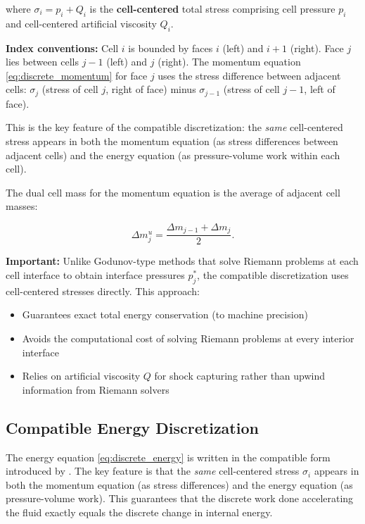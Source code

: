 \documentclass[12pt,a4paper]{article}
\begin{document}
\noindent where $\sigma_i = p_i + Q_i$ is the \textbf{cell-centered} total stress comprising cell pressure $p_i$ and cell-centered artificial viscosity $Q_i$.

\textbf{Index conventions:} Cell $i$ is bounded by faces $i$ (left) and $i+1$ (right). Face $j$ lies between cells $j-1$ (left) and $j$ (right). The momentum equation \eqref{eq:discrete_momentum} for face $j$ uses the stress difference between adjacent cells: $\sigma_j$ (stress of cell $j$, right of face) minus $\sigma_{j-1}$ (stress of cell $j-1$, left of face).

This is the key feature of the compatible discretization: the \emph{same} cell-centered stress appears in both the momentum equation (as stress differences between adjacent cells) and the energy equation (as pressure-volume work within each cell).

The dual cell mass for the momentum equation is the average of adjacent cell masses:

\begin{equation}
    \Delta m_j^u = \frac{\Delta m_{j-1} + \Delta m_j}{2}.
    \label{eq:dual_mass}
\end{equation}

\textbf{Important:} Unlike Godunov-type methods that solve Riemann problems at each cell interface to obtain interface pressures $p^*_j$, the compatible discretization uses cell-centered stresses directly. This approach:
\begin{itemize}
    \item Guarantees exact total energy conservation (to machine precision)
    \item Avoids the computational cost of solving Riemann problems at every interior interface
    \item Relies on artificial viscosity $Q$ for shock capturing rather than upwind information from Riemann solvers
\end{itemize}

\subsection{Compatible Energy Discretization}

The energy equation \eqref{eq:discrete_energy} is written in the compatible form introduced by \citet{Caramana1998}. The key feature is that the \emph{same} cell-centered stress $\sigma_i$ appears in both the momentum equation (as stress differences) and the energy equation (as pressure-volume work). This guarantees that the discrete work done accelerating the fluid exactly equals the discrete change in internal energy.
\end{document}
